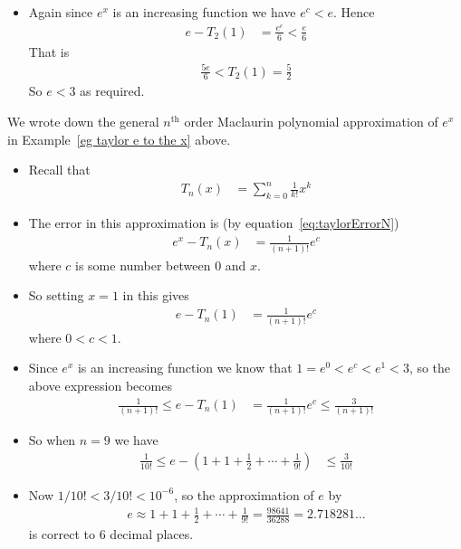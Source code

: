 \begin{eg}[Showing $e<3$]
\begin{itemize}
\item Again since $e^x$ is an increasing function we have $e^c < e$. Hence
\begin{align*}
  e - T_2(1) &= \frac{e^c}{6} < \frac{e}{6}
\end{align*}
That is
\begin{align*}
  \frac{5e}{6} < T_2(1) = \frac{5}{2}
\end{align*}
So $e<3$ as required.

\end{itemize}

\end{eg}



\begin{eg}[More on $e^x$]\label{eg:exp}
We wrote down the general $n^\mathrm{th}$ order Maclaurin polynomial approximation of
$e^x$ in Example~\ref{eg taylor e to the x} above.
\begin{itemize}
 \item Recall that
\begin{align*}
  T_n(x) &= \sum_{k=0}^n \frac{1}{k!} x^k
\end{align*}
\item The error in this approximation is (by equation~\eqref{eq:taylorErrorN})
\begin{align*}
  e^x - T_n(x) &= \frac{1}{(n+1)!} e^c
\end{align*}
where $c$ is some number between $0$ and $x$.

\item So setting $x=1$ in this gives
\begin{align*}
  e - T_n(1) &= \frac{1}{(n+1)!} e^c
\end{align*}
where $0<c<1$.
\item Since $e^x$ is an increasing function we know that $1 = e^0 < e^c < e^1 < 3$, so
the above expression becomes
\begin{align*}
  \frac{1}{(n+1)!} \leq e - T_n(1) &= \frac{1}{(n+1)!} e^c \leq \frac{3}{(n+1)!}
\end{align*}
\item So when $n=9$ we have
\begin{align*}
  \frac{1}{10!} \leq e - \left(1 + 1 + \frac{1}{2} +\cdots + \frac{1}{9!} \right) &\leq
  \frac{3}{10!}
\end{align*}
\item Now $1/10! < 3/10! < 10^{-6}$, so the approximation of $e$ by
\begin{align*}
  e \approx 1 + 1 + \frac{1}{2} +\cdots + \frac{1}{9!} = \frac{98641}{36288} =
2.718281\dots
\end{align*}
is correct to 6 decimal places.


\end{itemize}
\end{eg}
